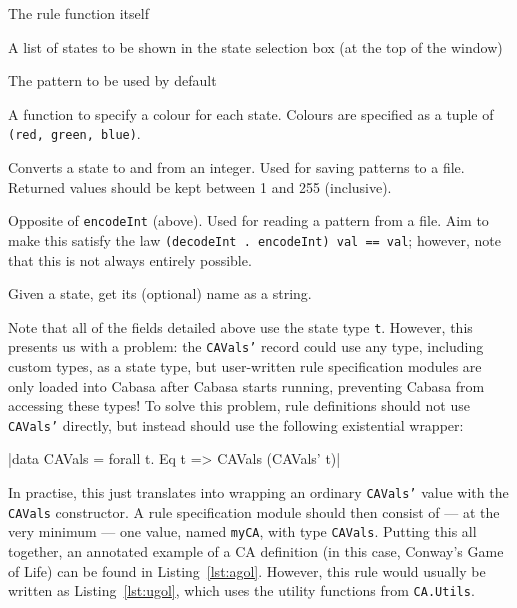 \documentclass[oneside,a4paper]{memoir}
\begin{document}
\begin{description}[font=\normalfont\bfseries\ttfamily]
\item[\_rule :: Point -> Universe t -> Rand StdGen t]
  The rule function itself
\item[\_states :: {[t]}]
  A list of states to be shown in the state selection box (at the top of the window)
\item[\_defaultPattern :: Universe t]
  The pattern to be used by default
\item[\_state2color :: t -> (Double, Double, Double)]
  A function to specify a colour for each state.
  Colours are specified as a tuple of \texttt{(red, green, blue)}.
\item[\_encodeInt :: t -> Int]
  Converts a state to and from an integer.
  Used for saving patterns to a file.
  Returned values should be kept between 1 and 255 (inclusive).
\item[\_decodeInt :: Int -> t]
  Opposite of \texttt{encodeInt} (above).
  Used for reading a pattern from a file.
  Aim to make this satisfy the law \texttt{(decodeInt . encodeInt) val == val};
    however, note that this is not always entirely possible.
\item[\_getName :: t -> Maybe String]
  Given a state, get its (optional) name as a string.
\end{description}

Note that all of the fields detailed above use the state type \texttt{t}.
However, this presents us with a problem:
  the \texttt{CAVals'} record could use any type, including custom types, as a state type,
  but user-written rule specification modules
  are only loaded into Cabasa after Cabasa starts running,
  preventing Cabasa from accessing these types!
To solve this problem, rule definitions should not use \texttt{CAVals'} directly,
  but instead should use the following existential wrapper:

|data CAVals = forall t. Eq t => CAVals (CAVals' t)|

In practise, this just translates into
  wrapping an ordinary \texttt{CAVals'} value with the \texttt{CAVals} constructor.
A rule specification module should then consist of
  --- at the very minimum ---
  one value, named \texttt{myCA}\footnotemark, with type \texttt{CAVals}.
Putting this all together,
  an annotated example of a CA definition (in this case, Conway's Game of Life) can be found in Listing~\ref{lst:agol}.
However, this rule would usually be written as Listing~\ref{lst:ugol},
  which uses the utility functions from \texttt{CA.Utils}.
\end{document}
